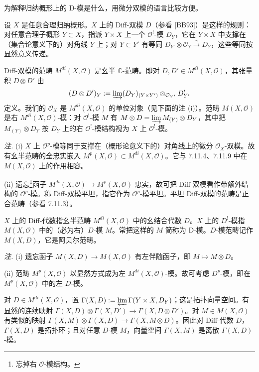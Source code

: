  为解释归纳概形上的 D-模是什么，用微分双模的语言比较方便。

设 $X$ 是任意合理归纳概形。$X$ 上的 Diff-双模 $D$（参看 [BB93]）是这样的规则：对任意合理子概形 $Y\subset X$，指派 $Y\times X$ 上一个 $\mathcal{O}^!$-模 $D_Y$，它在 $Y\times X$ 中支撑在（集合论意义下的）对角线 $Y$ 上；对 $Y\subset Y'$ 有等同 $D_{Y'}\otimes\mathcal{O}_Y\xrightarrow{\sim}D_Y$，这些等同按显然意义传递。

Diff-双模的范畴 $M^{di}(X,\mathcal{O})$ 是幺半 $\mathbb{C}$-范畴。即对 $D,D'\in M^{di}(X,\mathcal{O})$，其张量积 $D\otimes D'$ 由
\[
(D\otimes D')_Y:=\varinjlim(D_Y)_{(Y\times Y')}\otimes_{\mathcal{O}_{Y'}}D'_{Y'}
\]
定义。我们的 $\mathcal{O}_X$ 是 $M^{di}(X,\mathcal{O})$ 的单位对象（见下面的注 (i)）。范畴 $M(X,\mathcal{O})$ 是右 $M^{di}(X,\mathcal{O})$-模：对 $\mathcal{O}^!$-模 $M$ 有 $M\otimes D=\varinjlim M_{(Y)}\otimes D_Y$，其中把 $M_{(Y)}\otimes D_Y$ 按 $D_Y$ 上的右 $\mathcal{O}^!$-模结构视为 $X$ 上 $\mathcal{O}^!$-模。

\emph{注.} (i) $X$ 上 $\mathcal{O}^p$-模等同于支撑在（概形论意义下的）对角线上的微分 $\mathcal{O}_X$-双模。故有幺半范畴的全忠实嵌入 $M^p(X,\mathcal{O})\subset M^{di}(X,\mathcal{O})$。它与 7.11.4、7.11.9 中在 $M(X,\mathcal{O})$ 上的作用相容。

(ii) 遗忘\footnote{忘掉右 $\mathcal{O}$-模结构。}函子 $M^{di}(X,\mathcal{O})\to M^p(X,\mathcal{O})$ 忠实，故可把 Diff-双模看作带额外结构的 $\mathcal{O}^p$-模。称 Diff-双模平坦，指它作为 $\mathcal{O}^p$-模平坦。平坦 Diff-双模的范畴是正合范畴（参看 7.11.3）。

$X$ 上的 Diff-代数指幺半范畴 $M^{di}(X,\mathcal{O})$ 中的幺结合代数 $D$。$X$ 上的 $D^!$-模指 $M(X,\mathcal{O})$ 中的（必为右）$D$-模 $M$。常把这样的 $M$ 简称为 D-模。$D$-模范畴记作 $M(X,D)$，它是阿贝尔范畴。

\emph{注.} (i) 遗忘函子 $M(X,D)\to M(X,\mathcal{O})$ 有左伴随函子，即 $M\mapsto M\otimes D$。

(ii) 范畴 $M^p(X,\mathcal{O})$ 以显然方式成为左 $M^{di}(X,\mathcal{O})$-模。故可考虑 $D^p$-模，即在 $M^p(X,\mathcal{O})$ 中的左 $D$-模。

对 $D\in M^{di}(X,\mathcal{O})$，置 $\Gamma(X,D):=\varprojlim\Gamma(Y\times X,D_Y)$；这是拓扑向量空间。有显然的连续映射 $\Gamma(X,D)\otimes\Gamma(X,D')\to\Gamma(X,D\otimes D')$。对 $M\in M(X,\mathcal{O})$ 有类似的映射 $\Gamma(X,M)\otimes\Gamma(X,D)\to\Gamma(X,M\otimes D)$。因此对 Diff-代数 $D$，$\Gamma(X,D)$ 是拓扑环；且对任意 $D$-模 $M$，向量空间 $\Gamma(X,M)$ 是离散 $\Gamma(X,D)$-模。

